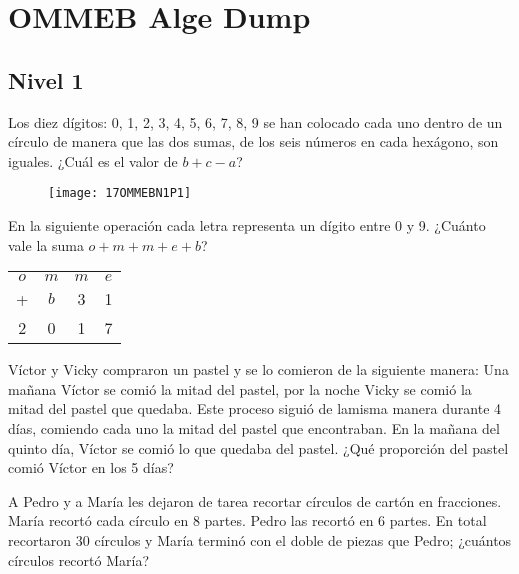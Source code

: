 \chapter{OMMEB Alge Dump}

\section{Nivel 1}

\begin{problem}[OMMEB 2017]
    Los diez dígitos: 0, 1, 2, 3, 4, 5, 6, 7, 8, 9 se han 
    colocado cada uno dentro de un círculo de manera que las 
    dos sumas, de los seis números en cada hexágono, son iguales. 
    ¿Cuál es el valor de $b + c - a$?
\end{problem}

\begin{figure}[h]
    \centering
    \texttt{[image: 17OMMEBN1P1]}
\end{figure}

\begin{problem}[OMMEB 2017]
    En la siguiente operación cada letra representa un dígito 
    entre 0 y 9. ¿Cuánto vale la suma $o+m+m+e+b$?
\end{problem}

\begin{center}
    \begin{tabular}{cccc}
        $o$ & $m$ & $m$ & $e$ \\
        + & $b$ & 3 & 1 \\
        \hline
        2 & 0 & 1 & 7 \\
    \end{tabular}
\end{center}

\begin{problem}[OMMEB 2017]
    Víctor y Vicky compraron un pastel y se lo comieron de la 
    siguiente manera: Una mañana Víctor se comió la mitad del 
    pastel, por la noche Vicky se comió la mitad del pastel que 
    quedaba. Este proceso siguió de lamisma manera durante 4 días, 
    comiendo cada uno la mitad del pastel que encontraban. 
    En la mañana del quinto día, Víctor se comió lo que quedaba 
    del pastel. ¿Qué proporción del pastel comió Víctor en los 5 
    días?
\end{problem}

\begin{problem}[OMMEB 2017]
    A Pedro y a María les dejaron de tarea recortar círculos de 
    cartón en fracciones. María recortó cada círculo en \(8\) 
    partes. Pedro las recortó en \(6\) partes. En total recortaron 
    \(30\) círculos y María terminó con el doble de piezas que 
    Pedro; ¿cuántos círculos recortó María?

\end{problem}

